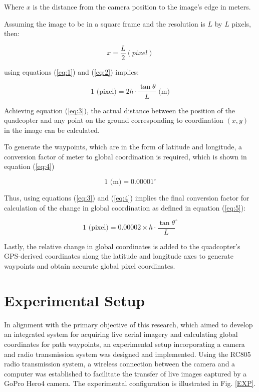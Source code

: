 \documentclass[conference]{IEEEtran}
\begin{document}
	Where \( x \) is the distance from the camera position to the image's edge in meters.
	
	Assuming the image to be in a square frame and the resolution is \( L \) by \( L \) pixels, then:
	
	\begin{equation}
		{x}=\frac{L}{2}\left(pixel\right)
		\label{eq:2}
	\end{equation}
	
	using equations (\ref{eq:1}) and (\ref{eq:2}) implies:
	
	\begin{equation}
		1 \text{ (pixel)} = 2h \cdot \frac{\tan \theta}{L} \text{ (m)}
		\label{eq:3}
	\end{equation}
	
	
	Achieving equation (\ref{eq:3}), the actual distance between the position of the quadcopter and any point on the ground corresponding to coordination \((x, y)\) in the image can be calculated. 
	
	To generate the waypoints, which are in the form of latitude and longitude, a conversion factor of meter to global coordination is required, which is shown in equation (\ref{eq:4}) 
	
	\begin{equation}
		1 \text{ (m)} = 0.00001^\circ
		\label{eq:4}
	\end{equation}
	
	Thus, using equations (\ref{eq:3}) and (\ref{eq:4}) implies the final conversion factor for calculation of the change in global coordination as defined in equation (\ref{eq:5}):
	
	\begin{equation}
		1 \text{ (pixel)} = 0.00002 \times h \cdot \frac{\tan \theta}{L}^\circ
		\label{eq:5}
	\end{equation}
	
	Lastly, the relative change in global coordinates is added to the quadcopter's GPS-derived coordinates along the latitude and longitude axes to generate waypoints and obtain accurate global pixel coordinates.

	
	\section{Experimental Setup}\label{Experimental Setup}
	In alignment with the primary objective of this research, which aimed to develop an integrated system for acquiring live aerial imagery and calculating global coordinates for path waypoints, an experimental setup incorporating a camera and radio transmission system was designed and implemented. Using the RC805 radio transmission system, a wireless connection between the camera and a computer was established to facilitate the transfer of live images captured by a GoPro Hero4 camera. The experimental configuration is illustrated in Fig.
	\ref{EXP}.
	
\end{document}
